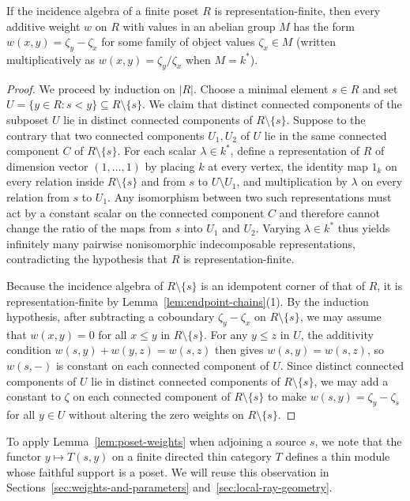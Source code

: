 \begin{lemma}
\label{lem:poset-weights}
If the incidence algebra of a finite poset $R$ is representation-finite, then
every additive weight $w$ on $R$ with values in an abelian group $M$ has the
form $w(x,y)=\zeta_y-\zeta_x$ for some family of object values
$\zeta_x\in M$ (written multiplicatively as $w(x,y)=\zeta_y/\zeta_x$ when
$M=k^*$).
\end{lemma}
\begin{proof}
We proceed by induction on $|R|$. Choose a minimal element $s\in R$ and set
$U=\{y\in R:s<y\}\subseteq R\setminus\{s\}$. We claim that distinct
connected components of the subposet $U$ lie in distinct connected components
of $R\setminus\{s\}$. Suppose to the contrary that two connected components
$U_1,U_2$ of $U$ lie in the same connected component $C$ of
$R\setminus\{s\}$. For each scalar $\lambda\in k^*$, define a representation
of $R$ of dimension vector $(1,\ldots,1)$ by placing $k$ at every vertex, the
identity map $1_k$ on every relation inside $R\setminus\{s\}$ and from $s$ to
$U\setminus U_1$, and multiplication by $\lambda$ on every relation from $s$
to $U_1$. Any isomorphism between two such representations must act by a
constant scalar on the connected component $C$ and therefore cannot change
the ratio of the maps from $s$ into $U_1$ and $U_2$. Varying $\lambda\in k^*$
thus yields infinitely many pairwise nonisomorphic indecomposable
representations, contradicting the hypothesis that $R$ is
representation-finite.

Because the incidence algebra of $R\setminus\{s\}$ is an idempotent corner of
that of $R$, it is representation-finite by Lemma~\ref{lem:endpoint-chains}(1).
By the induction hypothesis, after subtracting a coboundary $\zeta_y-\zeta_x$
on $R\setminus\{s\}$, we may assume that $w(x,y)=0$ for all $x\leq y$ in
$R\setminus\{s\}$. For any $y\leq z$ in $U$, the additivity condition
$w(s,y)+w(y,z)=w(s,z)$ then gives $w(s,y)=w(s,z)$, so $w(s,-)$ is constant on
each connected component of $U$. Since distinct connected components of $U$
lie in distinct connected components of $R\setminus\{s\}$, we may add a
constant to $\zeta$ on each connected component of $R\setminus\{s\}$ to make
$w(s,y)=\zeta_y-\zeta_s$ for all $y\in U$ without altering the zero weights
on $R\setminus\{s\}$.
\end{proof}

To apply Lemma~\ref{lem:poset-weights} when adjoining a source $s$, we note
that the functor $y\mapsto T(s,y)$ on a finite directed thin category $T$
defines a thin module whose faithful support is a poset. We will reuse this
observation in Sections~\ref{sec:weights-and-parameters}
and~\ref{sec:local-ray-geometry}.

